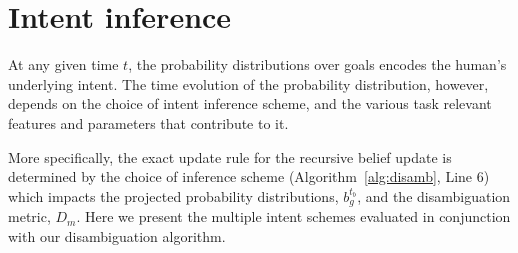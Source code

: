 \documentclass[conference]{IEEEtran}
\begin{document}
%		
%		
%		
%		
%		


\section{Intent inference}\label{sec:inference}
At any given time $t$, the probability distributions over goals encodes the human's underlying intent. The time evolution of the probability distribution, however, depends on the choice of intent inference scheme, and the various task relevant features and parameters that contribute to it. 

More specifically, the exact update rule for the recursive belief update is determined by the choice of inference scheme (Algorithm~\ref{alg:disamb}, Line 6) which impacts the projected probability distributions, $b_g^{t_b}$, and the disambiguation metric, $D_m$. Here we present the multiple intent schemes evaluated in conjunction with our disambiguation algorithm. 
\end{document}
